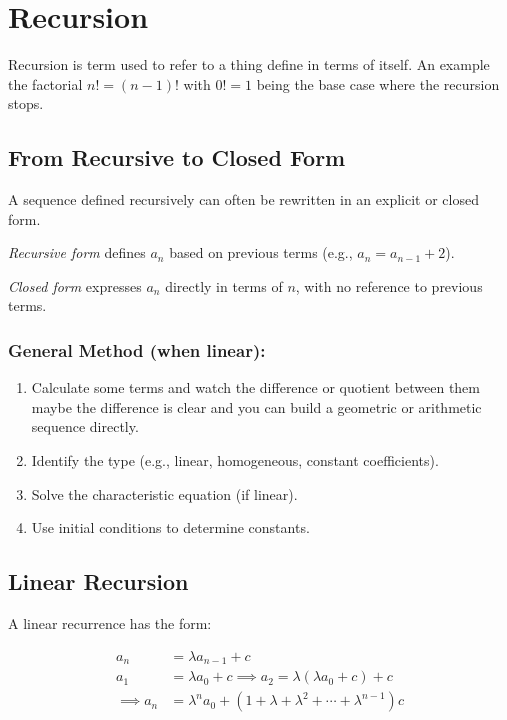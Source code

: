 \newpage
\section{Recursion}

Recursion is term used to refer to a thing define in terms
of itself. An example the factorial \(n! = (n - 1)\)! with \(0! = 1\) being the
base case where the recursion stops.

\subsection{From Recursive to Closed Form}

A sequence defined recursively can often be rewritten in an explicit or closed form.

\emph{Recursive form} defines \( a_n \) based on previous terms (e.g., \( a_n = a_{n-1} + 2 \)).

\emph{Closed form} expresses \( a_n \) directly in terms of \( n \), with no reference to previous terms.

\subsubsection{General Method (when linear):}
\begin{enumerate}
    \item Calculate some terms and watch the difference or quotient between them
    maybe the difference is clear and you can build a geometric or arithmetic sequence directly.
    \item Identify the type (e.g., linear, homogeneous, constant coefficients).
    \item Solve the characteristic equation (if linear).
    \item Use initial conditions to determine constants.
\end{enumerate}

\subsection{Linear Recursion}

A linear recurrence has the form:

\begin{align*}
a_n & = \lambda a_{n -1} + c \\
a_1 & = \lambda a_0 + c \implies a_2 = \lambda (\lambda a_0 + c) + c \\
\implies a_n & = \lambda^n a_0 + (1 + \lambda + \lambda^2 + \cdots + \lambda^{n - 1})c
\end{align*}

